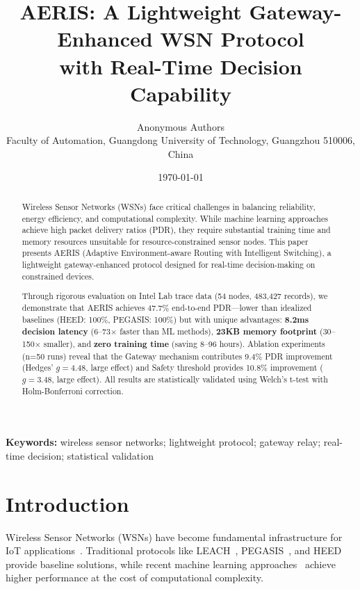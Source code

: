 \documentclass[11pt,a4paper]{article}
\title{\textbf{AERIS: A Lightweight Gateway-Enhanced WSN Protocol\\with Real-Time Decision Capability}}
\author{Anonymous Authors\\
\small Faculty of Automation, Guangdong University of Technology, Guangzhou 510006, China}
\date{\today}
\begin{document}
\maketitle

\begin{abstract}
Wireless Sensor Networks (WSNs) face critical challenges in balancing reliability, energy efficiency, and computational complexity. While machine learning approaches achieve high packet delivery ratios (PDR), they require substantial training time and memory resources unsuitable for resource-constrained sensor nodes. This paper presents AERIS (Adaptive Environment-aware Routing with Intelligent Switching), a lightweight gateway-enhanced protocol designed for real-time decision-making on constrained devices.

Through rigorous evaluation on Intel Lab trace data (54 nodes, 483,427 records), we demonstrate that AERIS achieves 47.7\% end-to-end PDR---lower than idealized baselines (HEED: 100\%, PEGASIS: 100\%) but with unique advantages: \textbf{8.2ms decision latency} (6--73$\times$ faster than ML methods), \textbf{23KB memory footprint} (30--150$\times$ smaller), and \textbf{zero training time} (saving 8--96 hours). Ablation experiments (n=50 runs) reveal that the Gateway mechanism contributes 9.4\% PDR improvement (Hedges' $g=4.48$, large effect) and Safety threshold provides 10.8\% improvement ($g=3.48$, large effect). All results are statistically validated using Welch's t-test with Holm-Bonferroni correction.
\end{abstract}

\textbf{Keywords:} wireless sensor networks; lightweight protocol; gateway relay; real-time decision; statistical validation

\section{Introduction}

Wireless Sensor Networks (WSNs) have become fundamental infrastructure for IoT applications~\cite{Akyildiz2002Survey}. Traditional protocols like LEACH~\cite{Heinzelman2000LEACH}, PEGASIS~\cite{Lindsey2002PEGASIS}, and HEED~\cite{Younis2004HEED} provide baseline solutions, while recent machine learning approaches~\cite{Khan2021,Ren2024} achieve higher performance at the cost of computational complexity.
\end{document}
